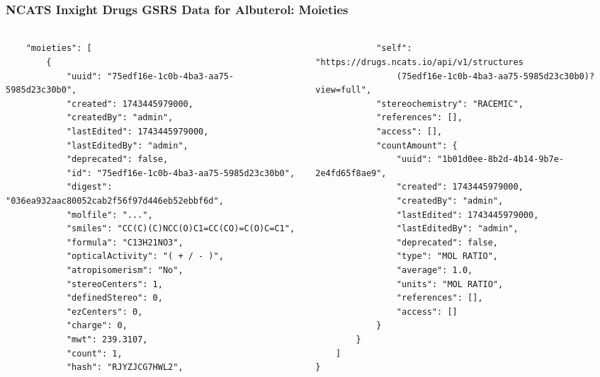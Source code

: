 \documentclass[aspectratio=169,xcolor=dvipsnames]{beamer}
\begin{document}
\begin{frame}[fragile,t]
  \frametitle{NCATS Inxight Drugs GSRS Data for Albuterol: Moieties}
  \framesubtitle{}
  \tiny
  \begin{columns}[t]
    \begin{column}{0.5\textwidth}
\begin{verbatim}
    "moieties": [
        {
            "uuid": "75edf16e-1c0b-4ba3-aa75-5985d23c30b0",
            "created": 1743445979000,
            "createdBy": "admin",
            "lastEdited": 1743445979000,
            "lastEditedBy": "admin",
            "deprecated": false,
            "id": "75edf16e-1c0b-4ba3-aa75-5985d23c30b0",
            "digest": "036ea932aac80052cab2f56f97d446eb52ebbf6d",
            "molfile": "...",
            "smiles": "CC(C)(C)NCC(O)C1=CC(CO)=C(O)C=C1",
            "formula": "C13H21NO3",
            "opticalActivity": "( + / - )",
            "atropisomerism": "No",
            "stereoCenters": 1,
            "definedStereo": 0,
            "ezCenters": 0,
            "charge": 0,
            "mwt": 239.3107,
            "count": 1,
            "hash": "RJYZJCG7HWL2",
\end{verbatim}
    \end{column}
    \begin{column}{0.5\textwidth}
\begin{verbatim}
            "self": "https://drugs.ncats.io/api/v1/structures
                (75edf16e-1c0b-4ba3-aa75-5985d23c30b0)?view=full",
            "stereochemistry": "RACEMIC",
            "references": [],
            "access": [],
            "countAmount": {
                "uuid": "1b01d0ee-8b2d-4b14-9b7e-2e4fd65f8ae9",
                "created": 1743445979000,
                "createdBy": "admin",
                "lastEdited": 1743445979000,
                "lastEditedBy": "admin",
                "deprecated": false,
                "type": "MOL RATIO",
                "average": 1.0,
                "units": "MOL RATIO",
                "references": [],
                "access": []
            }
        }
    ]
}
\end{verbatim}
    \end{column}
  \end{columns}
\end{frame}
\end{document}
